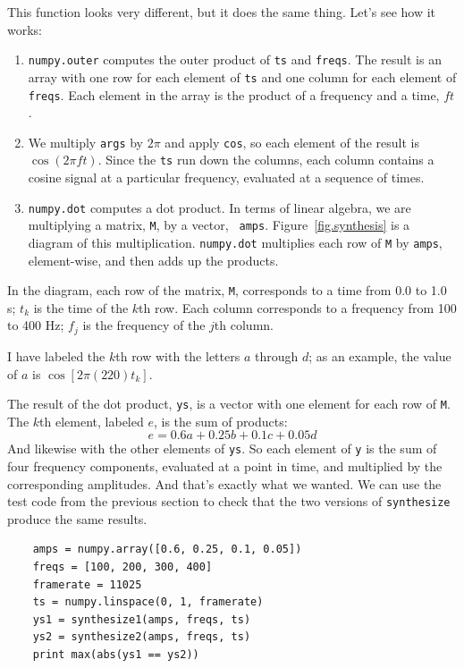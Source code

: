 \documentclass[12pt]{book}
\begin{document}
This function looks very different, but it does the same thing.
Let's see how it works:

\begin{enumerate}

\item {\tt numpy.outer} computes the outer product of {\tt ts} and
  {\tt freqs}.  The result is an array with one row for each element
  of {\tt ts} and one column for each element of {\tt freqs}.  Each
  element in the array is the product of a frequency and a time, $f
  t$.

\item We multiply {\tt args} by $2 \pi$ and apply {\tt cos}, so each
  element of the result is $\cos (2 \pi f t)$.  Since the {\tt ts} run
  down the columns, each column contains a cosine signal at a
  particular frequency, evaluated at a sequence of times.

\item {\tt numpy.dot} computes a dot product.  In terms of linear
  algebra, we are multiplying a matrix, {\tt M}, by a vector, {\tt
    amps}.  Figure~\ref{fig.synthesis} is a diagram of this
  multiplication.  {\tt numpy.dot} multiplies each row of {\tt M} by
  {\tt amps}, element-wise, and then adds up the products.

\end{enumerate}

In the diagram, each row of the matrix, {\tt M}, corresponds to a time 
from 0.0 to 1.0 s; $t_k$ is the time of the $k$th row.
Each column corresponds to a frequency from
100 to 400 Hz; $f_j$ is the frequency of the $j$th column.

I have labeled the $k$th row with the letters $a$ through $d$; as an
example, the value of $a$ is $\cos [2 \pi (220) t_k]$.

The result of the dot product, {\tt ys}, is a vector with one element
for each row of {\tt M}.  The $k$th element, labeled $e$, is the sum
of products:
%
\[ e = 0.6 a + 0.25 b + 0.1 c + 0.05 d \]
%
And likewise with the other elements of {\tt ys}.  So each element
of {\tt y} is the sum of four frequency components, evaluated at
a point in time, and multiplied by the corresponding amplitudes.
And that's exactly what we wanted.  We can use the test code from
the previous section to
check that the two versions of {\tt synthesize} produce the same results.

\begin{verbatim}
    amps = numpy.array([0.6, 0.25, 0.1, 0.05])
    freqs = [100, 200, 300, 400]
    framerate = 11025
    ts = numpy.linspace(0, 1, framerate)
    ys1 = synthesize1(amps, freqs, ts)
    ys2 = synthesize2(amps, freqs, ts)
    print max(abs(ys1 == ys2))
\end{verbatim}
\end{document}
